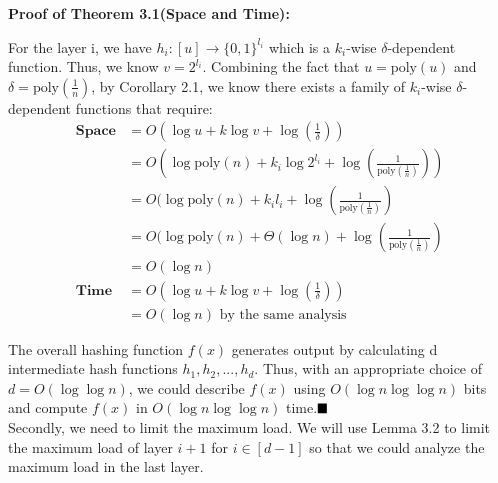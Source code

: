 \documentclass[a4paper, english]{paper}
\begin{document}
	\noindent\textbf{Proof of Theorem 3.1(Space and Time):} \par
	For the layer i, we have $h_i:[u]\rightarrow\{0,1\}^{l_i}$ which is a $k_i$-wise $\delta$-dependent function. Thus, we know $v = 2^{l_i}$. Combining the fact that $u = \text{poly}(u)$ and $\delta=\text{poly}(\frac1n)$, by Corollary 2.1, we know there exists a family of $k_i$-wise $\delta$-dependent functions that require:
\begin{align*}
\textbf{Space} &= O(\log u+k\log v+\log(\frac1\delta))\\
&= O(\log \text{poly}(n) + k_i\log 2^{l_i}+\log(\frac1{\text{poly}(\frac1n)}))\\
&= O(\log \text{poly}(n) + k_il_i+\log(\frac1{\text{poly}(\frac1n)})\\
&= O(\log \text{poly}(n) + \Theta(\log n)+\log(\frac1{\text{poly}(\frac1n)})\\
&= O(\log n)\\
\textbf{Time} &= O(\log u+k\log v+\log(\frac1\delta))\\
&=  O(\log n)\text{ by the same analysis}
\end{align*}\par
 The overall hashing function $f(x)$ generates output by calculating d intermediate hash functions $h_1,h_2,...,h_d$. Thus, with an appropriate choice of $d= O(\log\log n)$, we could describe $f(x)$ using $O(\log n\log\log n)$ bits and compute $f(x)$ in $O(\log n\log\log n)$ time.$\hfill\blacksquare$\\

	Secondly, we need to limit the maximum load. We will use Lemma 3.2 to limit the maximum load of layer $i+1$ for $i\in[d-1]$ so that we could analyze the maximum load in the last layer. 
	
\end{document}
